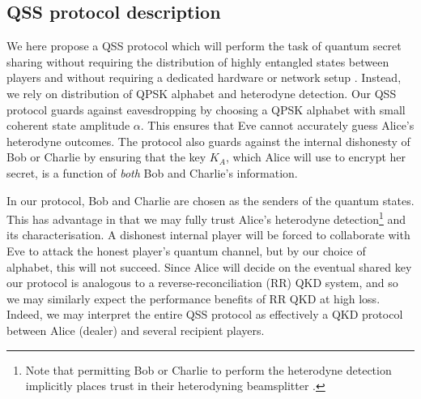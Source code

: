 \subsection{QSS protocol description}

We here propose a QSS protocol which will perform the task of quantum secret sharing without requiring the distribution of highly entangled states between players \cite{Kogias2017} and without requiring a dedicated hardware or network setup \cite{Grice2019}. Instead, we rely on distribution of QPSK alphabet and heterodyne detection. Our QSS protocol guards against eavesdropping by choosing a QPSK alphabet with small coherent state amplitude $\alpha$. This ensures that Eve cannot accurately guess Alice's heterodyne outcomes. The protocol also guards against the internal dishonesty of Bob or Charlie by ensuring that the key $K_A$, which Alice will use to encrypt her secret, is a function of \emph{both} Bob and Charlie's information.

In our protocol, Bob and Charlie are chosen as the senders of the quantum states. This has advantage in that we may fully trust Alice's heterodyne detection\footnote{Note that permitting Bob or Charlie to perform the heterodyne detection implicitly places trust in their heterodyning beamsplitter \cite{Walk2016a}. %
} and its characterisation. A dishonest internal player will be forced to collaborate with Eve to attack the honest player's quantum channel, but by our choice of alphabet, this will not succeed. Since Alice will decide on the eventual shared key our protocol is analogous to a reverse-reconciliation (RR) QKD system, and so we may similarly expect the performance benefits of RR QKD at high loss. Indeed, we may interpret the entire QSS protocol as effectively a QKD protocol between Alice (dealer) and several recipient players.

